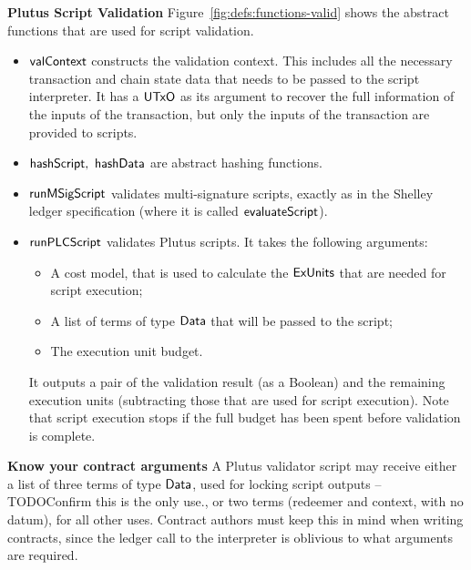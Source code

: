 \textbf{Plutus Script Validation}
Figure~\ref{fig:defs:functions-valid} shows the abstract functions that are used for script validation.

\begin{itemize}
\item
  $\mathsf{valContext}$ constructs the validation context.
  This includes all the necessary transaction and chain state data that needs to be passed to the script interpreter.
    It has a $\mathsf{UTxO}$ as its argument to recover the full information of the inputs of the transaction,
    but only the inputs of the transaction are provided to scripts.
\item
    $\mathsf{hashScript},~ \mathsf{hashData}$ are abstract hashing functions.
\item
  $\mathsf{runMSigScript}$ validates multi-signature scripts, exactly as in the Shelley ledger specification (where it is called $\mathsf{evaluateScript}$).
\item
  $\mathsf{runPLCScript}$ validates Plutus scripts. It takes the following
  arguments:
  \begin{itemize}
  \item A cost model, that is used to calculate the $\mathsf{ExUnits}$ that are needed for script execution;
  \item A list of terms of type $\mathsf{Data}$ that will be passed to the script; %
  \item The execution unit budget.
  \end{itemize}
  It outputs a pair of the validation result (as a Boolean)
  and the remaining execution units (subtracting those that are used for script execution).
  Note that script execution stops if the full budget has been spent before validation is complete.
\end{itemize}

\begin{note}
  \textbf{Know your contract arguments}
  A Plutus validator script may receive either a list of three terms of type $\mathsf{Data}$, used for locking script outputs -- TODO{Confirm this is the only use.},
  or two terms (redeemer and context, with no datum), for all other uses.
  Contract authors must keep this in mind when writing contracts, since the ledger call to the interpreter is oblivious to what
  arguments are required.
\end{note}

